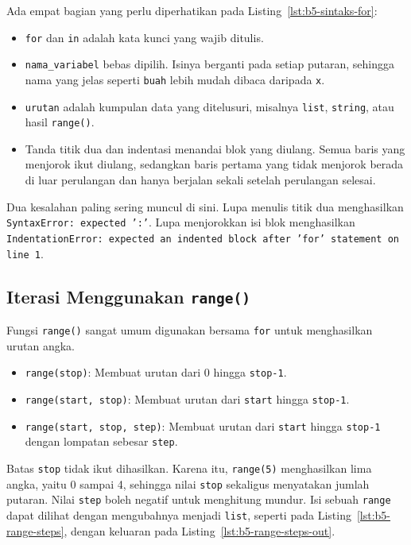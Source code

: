 Ada empat bagian yang perlu diperhatikan pada Listing~\ref{lst:b5-sintaks-for}:
\begin{itemize}
    \item \texttt{for} dan \texttt{in} adalah kata kunci yang wajib ditulis.
    \item \texttt{nama_variabel} bebas dipilih. Isinya berganti pada setiap putaran, sehingga nama yang jelas seperti \texttt{buah} lebih mudah dibaca daripada \texttt{x}.
    \item \texttt{urutan} adalah kumpulan data yang ditelusuri, misalnya \texttt{list}, \texttt{string}, atau hasil \texttt{range()}.
    \item Tanda titik dua dan indentasi menandai blok yang diulang. Semua baris yang menjorok ikut diulang, sedangkan baris pertama yang tidak menjorok berada di luar perulangan dan hanya berjalan sekali setelah perulangan selesai.
\end{itemize}

Dua kesalahan paling sering muncul di sini. Lupa menulis titik dua menghasilkan \texttt{SyntaxError: expected ':'}. Lupa menjorokkan isi blok menghasilkan \texttt{IndentationError: expected an indented block after 'for' statement on line 1}.

\subsection{Iterasi Menggunakan \texttt{range()}}
Fungsi \texttt{range()} sangat umum digunakan bersama \texttt{for} untuk menghasilkan urutan angka.
\begin{itemize}
    \item \texttt{range(stop)}: Membuat urutan dari 0 hingga \texttt{stop-1}.
    \item \texttt{range(start, stop)}: Membuat urutan dari \texttt{start} hingga \texttt{stop-1}.
    \item \texttt{range(start, stop, step)}: Membuat urutan dari \texttt{start} hingga \texttt{stop-1} dengan lompatan sebesar \texttt{step}.
\end{itemize}

Batas \texttt{stop} tidak ikut dihasilkan. Karena itu, \texttt{range(5)} menghasilkan lima angka, yaitu 0 sampai 4, sehingga nilai \texttt{stop} sekaligus menyatakan jumlah putaran. Nilai \texttt{step} boleh negatif untuk menghitung mundur. Isi sebuah \texttt{range} dapat dilihat dengan mengubahnya menjadi \texttt{list}, seperti pada Listing~\ref{lst:b5-range-steps}, dengan keluaran pada Listing~\ref{lst:b5-range-steps-out}.

